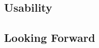 \documentclass[paper/ddppaper2.tex]{subfiles}
\begin{document}
\subsection{Usability}
\subsection{Looking Forward}
\end{document}
